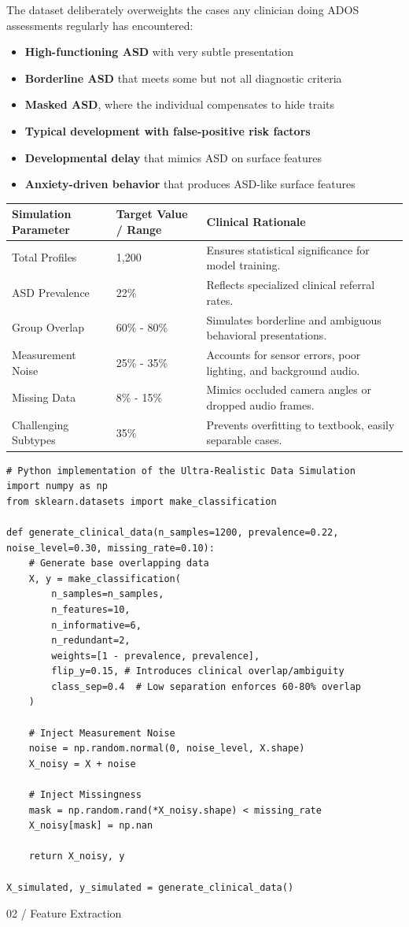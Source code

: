 \documentclass{obelus-preprint}
\begin{document}
The dataset deliberately overweights the cases any clinician doing ADOS assessments regularly has encountered:
\begin{itemize}[leftmargin=*]
  \item \textbf{High-functioning ASD} with very subtle presentation
  \item \textbf{Borderline ASD} that meets some but not all diagnostic criteria
  \item \textbf{Masked ASD}, where the individual compensates to hide traits
  \item \textbf{Typical development with false-positive risk factors}
  \item \textbf{Developmental delay} that mimics ASD on surface features
  \item \textbf{Anxiety-driven behavior} that produces ASD-like surface features
\end{itemize}
\begin{center}
\begin{tabular}{lll}
\toprule
\textbf{Simulation Parameter} & \textbf{Target Value / Range} & \textbf{Clinical Rationale} \\
\midrule
Total Profiles & 1,200 & Ensures statistical significance for model training. \\
ASD Prevalence & 22\% & Reflects specialized clinical referral rates. \\
Group Overlap & 60\% - 80\% & Simulates borderline and ambiguous behavioral presentations. \\
Measurement Noise & 25\% - 35\% & Accounts for sensor errors, poor lighting, and background audio. \\
Missing Data & 8\% - 15\% & Mimics occluded camera angles or dropped audio frames. \\
Challenging Subtypes & 35\% & Prevents overfitting to textbook, easily separable cases. \\
\bottomrule
\end{tabular}
\end{center}
\begin{verbatim}
# Python implementation of the Ultra-Realistic Data Simulation
import numpy as np
from sklearn.datasets import make_classification

def generate_clinical_data(n_samples=1200, prevalence=0.22, noise_level=0.30, missing_rate=0.10):
    # Generate base overlapping data
    X, y = make_classification(
        n_samples=n_samples,
        n_features=10,
        n_informative=6,
        n_redundant=2,
        weights=[1 - prevalence, prevalence],
        flip_y=0.15, # Introduces clinical overlap/ambiguity
        class_sep=0.4  # Low separation enforces 60-80% overlap
    )
    
    # Inject Measurement Noise
    noise = np.random.normal(0, noise_level, X.shape)
    X_noisy = X + noise
    
    # Inject Missingness
    mask = np.random.rand(*X_noisy.shape) < missing_rate
    X_noisy[mask] = np.nan
    
    return X_noisy, y

X_simulated, y_simulated = generate_clinical_data()
\end{verbatim}
02 / Feature Extraction
\end{document}
